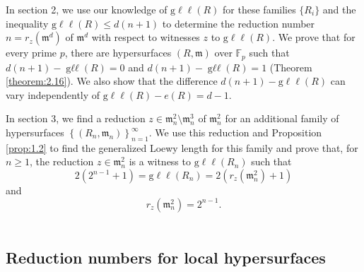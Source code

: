 \documentclass{amsart}
\theoremstyle{definition}
\theoremstyle{definition}
\numberwithin{equation}{section}
\theoremstyle{definition}
\DeclareMathOperator{\Gll}{g\ell\ell}
\begin{document}
{In section 2, we use our knowledge of $\text{g}\ell\ell(R)$ for these families $\{R_i\}$ and the inequality $\text{g}\ell\ell(R) \leq d(n+1)$ to determine the reduction number $n=r_{z}(\mathfrak{m}^d)$ of $\mathfrak{m}^d$ with respect to witnesses $z$ to $\text{g}\ell\ell(R)$. We prove that for every prime $p$, there are hypersurfaces $(R,\mathfrak{m})$ over $\mathbb{F}_p$ such that $d(n+1)-\Gll(R)=0$ and $d(n+1)-\Gll(R)=1$ (Theorem \ref{theorem:2.16}). We also show that the difference $d(n+1)-\text{g}\ell\ell(R)$ can vary independently of $\text{g}\ell\ell(R)-e(R)=d-1$. 

In section 3, we find a reduction $z \in \mathfrak{m}^2_n \setminus \mathfrak{m}^3_n$ of $\mathfrak{m}_n^2$ for an additional family of hypersurfaces $\left\{(R_n, \mathfrak{m}_n ) \right\}_{n=1}^{\infty}$. We use this reduction and Proposition \ref{prop:1.2} to find the generalized Loewy length for this family and prove that, for $n \geq 1$, the reduction $z \in \mathfrak{m}^2_n$ is a witness to $\text{g}\ell\ell(R_n)$ such that \\
\[
2(2^{n-1}+1)=\text{g}\ell\ell(R_n)=2(r_{z}(\mathfrak{m}_{n}^2)+1)
\]
and
\[
r_{z}(\mathfrak{m}_n^2)=2^{n-1}.
\]
\text{}\\
\begin{center}
\section{Reduction numbers for local hypersurfaces} 
\end{center}

}
\end{document}
